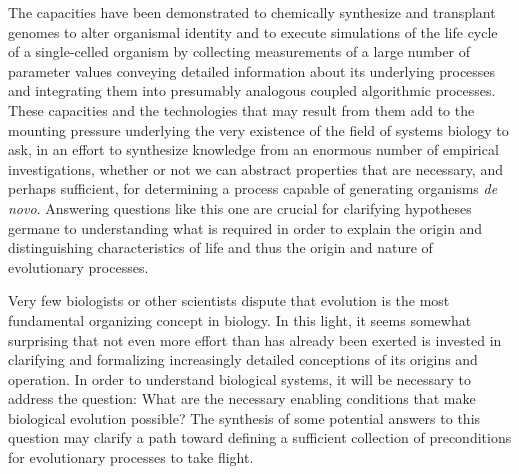 The capacities have been demonstrated to chemically synthesize and transplant genomes to alter organismal identity \cite{Gibson2010} and to execute simulations of the life cycle of a single-celled organism \cite{Karr2012} by collecting measurements of a large number of parameter values conveying detailed information about its underlying processes and integrating them into presumably analogous coupled algorithmic processes. These capacities and the technologies that may result from them add to the mounting pressure underlying the very existence of the field of systems biology to ask, in an effort to synthesize knowledge from an enormous number of empirical investigations, whether or not we can abstract properties that are necessary, and perhaps sufficient, for determining a process capable of generating organisms \emph{de novo}. Answering questions like this one are crucial for clarifying hypotheses germane to understanding what is required in order to explain the origin and distinguishing characteristics of life and thus the origin and nature of evolutionary processes.

Very few biologists or other scientists dispute that evolution is the most fundamental organizing concept in biology. In this light, it seems somewhat surprising that not even more effort than has already been exerted is invested in clarifying and formalizing increasingly detailed conceptions of its origins and operation. In order to understand biological systems, it will be necessary to address the question: What are the necessary enabling conditions that make biological evolution possible? The synthesis of some potential answers to this question may clarify a path toward defining a sufficient collection of preconditions for evolutionary processes to take flight.

